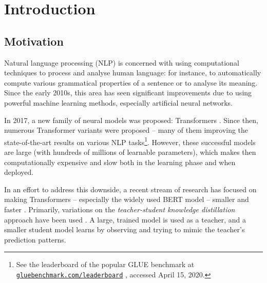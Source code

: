 \documentclass[bsc,frontabs,singlespacing,parskip,deptreport]{infthesis}
\newcommand\rurl[1]{%
  \href{https://#1}{\nolinkurl{#1}}%
}
\begin{document}
\chapter{Introduction}{
  \setcounter{page}{1}
  \section{Motivation}{
    Natural language processing (NLP) is concerned with using computational techniques to process and analyse human language: for instance, to automatically compute various grammatical properties of a sentence or to analyse its meaning.
    Since the early 2010s, this area has seen significant improvements due to using powerful machine learning methods, especially artificial neural networks.

    In 2017, a new family of neural models was proposed: Transformers \citep{Vaswani_2017}. Since then, numerous Transformer variants were proposed \citep{Radford_2018,Devlin_2018,Lan_2019,Liu_2019,Lample_2019} -- many of them improving the state-of-the-art results on various NLP tasks\footnote{See the leaderboard of the popular GLUE benchmark \citep{Wang_2018} at \rurl{gluebenchmark.com/leaderboard}, accessed April 15, 2020.}.
    However, these successful models are large (with hundreds of millions of learnable parameters), which makes then computationally expensive and slow both in the learning phase and when deployed.

    In an effort to address this downside, a recent stream of research has focused on making Transformers -- especially the widely used BERT model \citep{Devlin_2018} -- smaller and faster \citep{Michel_2019,Cheong_2019}.
    Primarily, variations on the \textit{teacher-student knowledge distillation} approach \citep{Bucila_2006} have been used \citep{Sun_2019a,Mukherjee_2019,Tang_2019a,Tang_2019b,Jiao_2019,Sanh_2019}.
    A large, trained model is used as a teacher, and a smaller student model learns by observing and trying to mimic the teacher's prediction patterns.
    
}}
\end{document}

